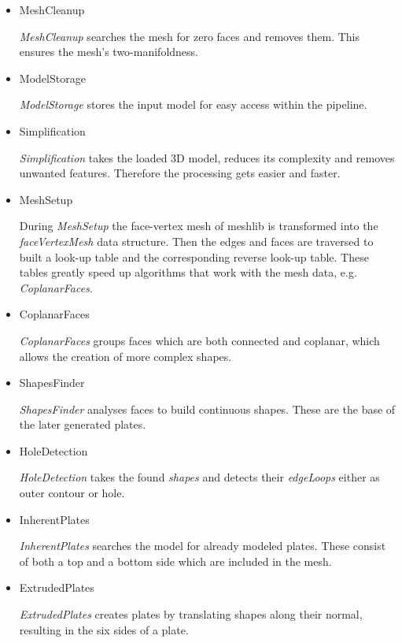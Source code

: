 \documentclass[../ClassicThesis.tex]{subfiles}
\begin{document}
\begin{itemize}
    \item MeshCleanup

\emph{MeshCleanup} searches the mesh for zero faces and removes them. This ensures the mesh's two-manifoldness.


\item ModelStorage

\emph{ModelStorage} stores the input model for easy access within the pipeline.


\item Simplification

\emph{Simplification} takes the loaded 3D model, reduces its complexity and removes unwanted features. Therefore the processing gets easier and faster. 


\item MeshSetup

During \emph{MeshSetup} the face-vertex mesh of meshlib is transformed into the \emph{faceVertexMesh} data structure. Then the edges and faces are traversed to built a look-up table and the corresponding reverse look-up table. These tables greatly speed up algorithms that work with the mesh data, e.g. \emph{CoplanarFaces}.


\item CoplanarFaces

\emph{CoplanarFaces} groups faces which are both connected and coplanar, which allows the creation of more complex shapes.


\item ShapesFinder

\emph{ShapesFinder} analyses faces to build continuous shapes. These are the base of the later generated plates.


\item HoleDetection

\emph{HoleDetection} takes the found \emph{shapes} and detects their \emph{edgeLoops} either as outer contour or hole.


\item InherentPlates

\emph{InherentPlates} searches the model for already modeled plates. These consist of both a top and a bottom side which are included in the mesh.


\item ExtrudedPlates

\emph{ExtrudedPlates} creates plates by translating shapes along their normal, resulting in the six sides of a plate.



\end{itemize}
\end{document}
